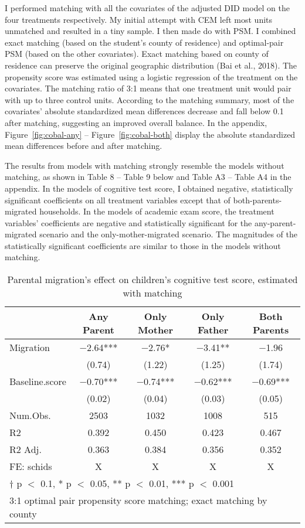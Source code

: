 \documentclass[
  man,floatsintext]{apa7}
\begin{document}
I performed matching with all the covariates of the adjusted DID model on the four treatments respectively. My initial attempt with CEM left most units unmatched and resulted in a tiny sample. I then made do with PSM. I combined exact matching (based on the student's county of residence) and optimal-pair PSM (based on the other covariates). Exact matching based on county of residence can preserve the original geographic distribution (Bai et al., 2018). The propensity score was estimated using a logistic regression of the treatment on the covariates. The matching ratio of 3:1 means that one treatment unit would pair with up to three control units. According to the matching summary, most of the covariates' absolute standardized mean differences decrease and fall below 0.1 after matching, suggesting an improved overall balance. In the appendix, Figure~\ref{fig:cobal-any} -- Figure~\ref{fig:cobal-both} display the absolute standardized mean differences before and after matching.

The results from models with matching strongly resemble the models without matching, as shown in Table 8 -- Table 9 below and Table A3 -- Table A4 in the appendix. In the models of cognitive test score, I obtained negative, statistically significant coefficients on all treatment variables except that of both-parents-migrated households. In the models of academic exam score, the treatment variables' coefficients are negative and statistically significant for the any-parent-migrated scenario and the only-mother-migrated scenario. The magnitudes of the statistically significant coefficients are similar to those in the models without matching.

\begin{table}

\caption{Parental migration’s effect on children’s cognitive test score, estimated with matching}
\centering
\begin{tabular}[t]{lcccc}
\toprule
  & Any Parent & Only Mother & Only Father & Both Parents\\
\midrule
Migration & \num{-2.64}*** & \num{-2.76}* & \num{-3.41}** & \num{-1.96}\\
 & (\num{0.74}) & (\num{1.22}) & (\num{1.25}) & (\num{1.74})\\
Baseline.score & \num{-0.70}*** & \num{-0.74}*** & \num{-0.62}*** & \num{-0.69}***\\
 & (\num{0.02}) & (\num{0.04}) & (\num{0.03}) & (\num{0.05})\\
\midrule
Num.Obs. & \num{2503} & \num{1032} & \num{1008} & \num{515}\\
R2 & \num{0.392} & \num{0.450} & \num{0.423} & \num{0.467}\\
R2 Adj. & \num{0.363} & \num{0.384} & \num{0.356} & \num{0.352}\\
FE: schids & X & X & X & X\\
\bottomrule
\multicolumn{5}{l}{\rule{0pt}{1em}† p $<$ 0.1, * p $<$ 0.05, ** p $<$ 0.01, *** p $<$ 0.001}\\
\multicolumn{5}{l}{\rule{0pt}{1em}3:1 optimal pair propensity score matching; exact matching by county}\\
\end{tabular}
\end{table}
\end{document}
